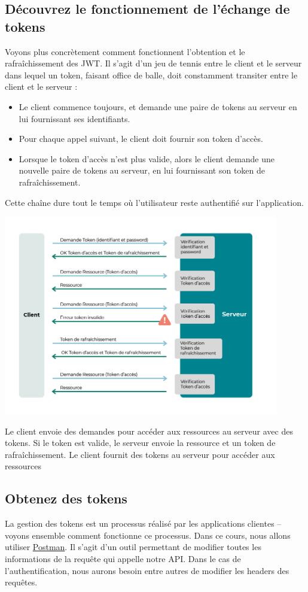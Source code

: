 \subsection{Découvrez le fonctionnement de l’échange de tokens}
Voyons plus concrètement comment fonctionnent l’obtention et le rafraîchissement des JWT. Il s’agit d’un {\color{monOrange}jeu de tennis} entre le client et le serveur dans lequel un token, faisant office de balle, doit constamment transiter entre le client et le serveur :
\begin{itemize}
\item Le client commence toujours, et {\color{monOrange}demande une paire de tokens} au serveur en lui fournissant ses identifiants.
\item Pour chaque appel suivant, le client doit fournir son {\color{monOrange}token d’accès}.
\item Lorsque le token d’accès n’est plus valide, alors le client demande une {\color{monOrange}nouvelle paire de tokens} au serveur, en lui fournissant son {\color{monOrange}token de rafraîchissement}.
\end{itemize}
Cette chaîne dure tout le temps où l’utilisateur reste authentifié sur l’application.
\begin{center}
\includegraphics[width=12cm]{images/image23.png}
\end{center}
Le client envoie des demandes pour accéder aux ressources au serveur avec des tokens. Si le token est valide, le serveur envoie la ressource et un token de rafraîchissement.
Le client fournit des tokens au serveur pour accéder aux ressources

\subsection{Obtenez des tokens}
La {\color{monOrange}gestion des tokens} est un processus réalisé par les applications clientes – voyons ensemble comment fonctionne ce processus. Dans ce cours, nous allons utiliser \href{https://www.postman.com}{Postman}. Il s’agit d’un outil permettant de modifier toutes les informations de la requête qui appelle notre API. Dans le cas de {\color{monOrange}l’authentification}, nous aurons besoin entre autres de modifier les headers des requêtes.

